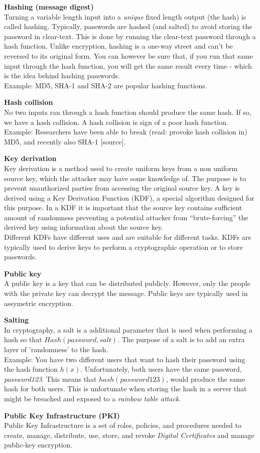 \textbf{Hashing (message digest)} \\
Turning a variable length input into a \textit{unique} fixed length output (the hash) is called hashing. Typically, passwords are hashed (and salted) to avoid storing the password in clear-text. This is done by running the clear-text password through a hash function. Unlike encryption, hashing is a one-way street and can't be reversed to its original form. You can however be sure that, if you run that same input through the hash function, you will get the same result every time - which is the idea behind hashing passwords. \\
Example: MD5, SHA-1 and SHA-2 are popular hashing functions. 

\textbf{Hash collision} \\
No two inputs ran through a hash function should produce the same hash. If so, we have a hash collision. A hash collision is sign of a poor hash function. \\
Example: Researchers have been able to break (read: provoke hash collision in) MD5, and recently also SHA-1 [source].


\textbf{Key derivation} \\
Key derivation is a method used to create uniform keys from a non uniform source key, which the attacker may have some knowledge of. The purpose is to prevent unauthorized parties from accessing the original source key. A key is derived using a Key Derivation Function (KDF), a special algorithm designed for this purpose. In a KDF it is important that the source key contains sufficient amount of randomness preventing a potential attacker from “brute-forcing” the derived key using information about the source key.\\
Different KDFs have different uses and are suitable for different tasks. KDFs are typically used to derive keys to perform a cryptographic operation or to store passwords. 

\textbf{Public key} \\
A public key is a key that can be distributed publicly. However, only the people with the private key can decrypt the message. Public keys are typically used in assymetric encryption.

\textbf{Salting} \\
In cryptography, a salt is a additional parameter that is used when performing a hash so that $Hash(password, salt)$. The purpose of a salt is to add an extra layer of 'randomness' to the hash. \\ Example: You have two different users that want to hash their password using the hash function $h(x)$. Unfortunately, both users have the same password, \textit{password123}. This means that $hash(password123)$, would produce the same hash for both users. This is unfortunate when storing the hash in a server that might be breached and exposed to a \textit{rainbow table attack}.            

\textbf{Public Key Infrastructure (PKI)} \\
Public Key Infrastructure is a set of roles, policies, and procedures needed to create, manage, distribute, use, store, and revoke \textit{Digital Certificates} and manage public-key encryption. 



\newpage
